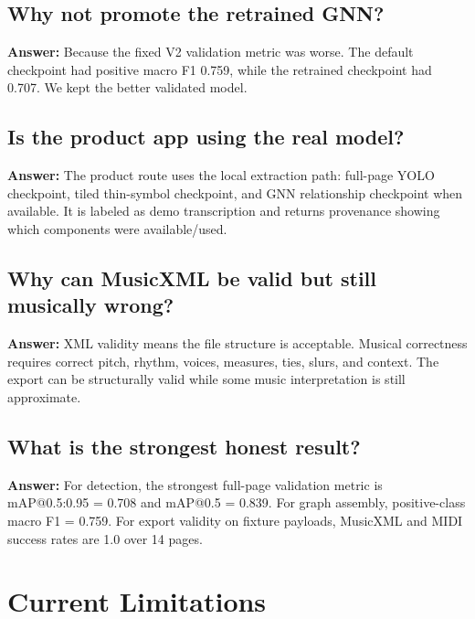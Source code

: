 \documentclass[11pt]{article}
\newcommand{\code}[1]{\texttt{\detokenize{#1}}}
\begin{document}
\subsection{Why not promote the retrained GNN?}

\textbf{Answer:} Because the fixed V2 validation metric was worse. The default checkpoint had positive macro F1 0.759, while the retrained checkpoint had 0.707. We kept the better validated model.

\subsection{Is the product app using the real model?}

\textbf{Answer:} The product route \code{/product/transcribe-image} uses the local extraction path: full-page YOLO checkpoint, tiled thin-symbol checkpoint, and GNN relationship checkpoint when available. It is labeled as demo transcription and returns provenance showing which components were available/used.

\subsection{Why can MusicXML be valid but still musically wrong?}

\textbf{Answer:} XML validity means the file structure is acceptable. Musical correctness requires correct pitch, rhythm, voices, measures, ties, slurs, and context. The export can be structurally valid while some music interpretation is still approximate.

\subsection{What is the strongest honest result?}

\textbf{Answer:} For detection, the strongest full-page validation metric is mAP@0.5:0.95 = 0.708 and mAP@0.5 = 0.839. For graph assembly, positive-class macro F1 = 0.759. For export validity on fixture payloads, MusicXML and MIDI success rates are 1.0 over 14 pages.

\section{Current Limitations}
\end{document}
